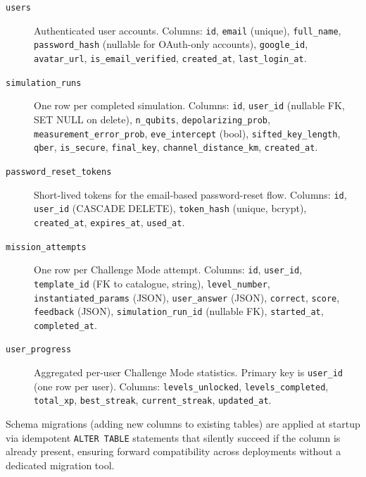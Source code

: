 \documentclass[12pt, a4paper]{article}
\begin{document}
\begin{description}
  \item[\texttt{users}] Authenticated user accounts. Columns: \texttt{id},
        \texttt{email} (unique), \texttt{full\_name}, \texttt{password\_hash}
        (nullable for OAuth-only accounts), \texttt{google\_id},
        \texttt{avatar\_url}, \texttt{is\_email\_verified},
        \texttt{created\_at}, \texttt{last\_login\_at}.

  \item[\texttt{simulation\_runs}] One row per completed simulation.
        Columns: \texttt{id}, \texttt{user\_id} (nullable FK, SET NULL on
        delete), \texttt{n\_qubits}, \texttt{depolarizing\_prob},
        \texttt{measurement\_error\_prob}, \texttt{eve\_intercept} (bool),
        \texttt{sifted\_key\_length}, \texttt{qber}, \texttt{is\_secure},
        \texttt{final\_key}, \texttt{channel\_distance\_km},
        \texttt{created\_at}.

  \item[\texttt{password\_reset\_tokens}] Short-lived tokens for the
        email-based password-reset flow. Columns: \texttt{id},
        \texttt{user\_id} (CASCADE DELETE), \texttt{token\_hash} (unique,
        bcrypt), \texttt{created\_at}, \texttt{expires\_at}, \texttt{used\_at}.

  \item[\texttt{mission\_attempts}] One row per Challenge Mode attempt.
        Columns: \texttt{id}, \texttt{user\_id}, \texttt{template\_id}
        (FK to catalogue, string), \texttt{level\_number},
        \texttt{instantiated\_params} (JSON), \texttt{user\_answer} (JSON),
        \texttt{correct}, \texttt{score}, \texttt{feedback} (JSON),
        \texttt{simulation\_run\_id} (nullable FK), \texttt{started\_at},
        \texttt{completed\_at}.

  \item[\texttt{user\_progress}] Aggregated per-user Challenge Mode
        statistics. Primary key is \texttt{user\_id} (one row per user).
        Columns: \texttt{levels\_unlocked}, \texttt{levels\_completed},
        \texttt{total\_xp}, \texttt{best\_streak}, \texttt{current\_streak},
        \texttt{updated\_at}.
\end{description}

Schema migrations (adding new columns to existing tables) are applied at
startup via idempotent \texttt{ALTER TABLE} statements that silently
succeed if the column is already present, ensuring forward compatibility
across deployments without a dedicated migration tool.
\end{document}
